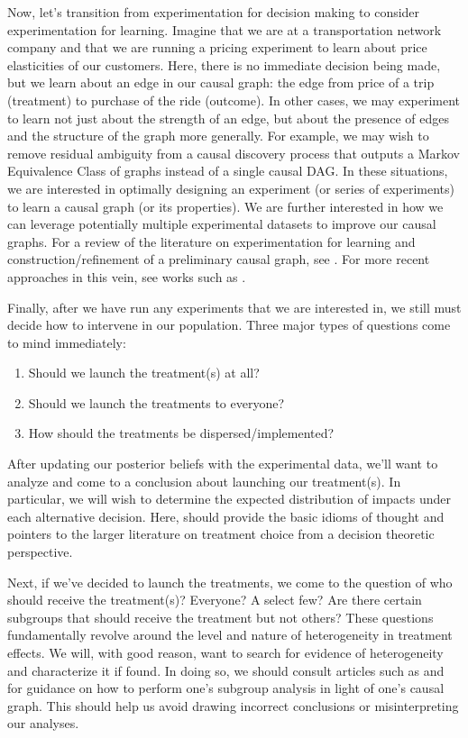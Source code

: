 Now, let's transition from experimentation for decision making to consider experimentation for learning.
Imagine that we are at a transportation network company and that we are running a pricing experiment to learn about price elasticities of our customers.
Here, there is no immediate decision being made, but we learn about an edge in our causal graph: the edge from price of a trip (treatment) to purchase of the ride (outcome).
In other cases, we may experiment to learn not just about the strength of an edge, but about the presence of edges and the structure of the graph more generally.
For example, we may wish to remove residual ambiguity from a causal discovery process that outputs a Markov Equivalence Class of graphs instead of a single causal DAG.
In these situations, we are interested in optimally designing an experiment (or series of experiments) to learn a causal graph (or its properties).
We are further interested in how we can leverage potentially multiple experimental datasets to improve our causal graphs.
For a review of the literature on experimentation for learning and construction/refinement of a preliminary causal graph, see \citet[Sec. 3.1.2]{kalisch_2014_causal}.
For more recent approaches in this vein, see works such as \citet{triantafillou_2015_constraint, kocaoglu_2017_experimental, brouillard_2020_differentiable, rantanen_2020_learning}.

Finally, after we have run any experiments that we are interested in, we still must decide how to intervene in our population.
Three major types of questions come to mind immediately:
\begin{enumerate}
   \item Should we launch the treatment(s) at all?
   \item Should we launch the treatments to everyone?
   \item How should the treatments be dispersed/implemented?
\end{enumerate}

After updating our posterior beliefs with the experimental data, we'll want to analyze and come to a conclusion about launching our treatment(s).
In particular, we will wish to determine the expected distribution of impacts under each alternative decision.
Here, \citet{manski_2019_treatment} should provide the basic idioms of thought and pointers to the larger literature on treatment choice from a decision theoretic perspective.

Next, if we've decided to launch the treatments, we come to the question of who should receive the treatment(s)?
Everyone?
A select few?
Are there certain subgroups that should receive the treatment but not others?
These questions fundamentally revolve around the level and nature of heterogeneity in treatment effects.
We will, with good reason, want to search for evidence of heterogeneity and characterize it if found.
In doing so, we should consult articles such as \citet{pearl_2017_detecting} and \citet{webster_2020_subgroup} for guidance on how to perform one's subgroup analysis in light of one's causal graph.
This should help us avoid drawing incorrect conclusions or misinterpreting our analyses.

